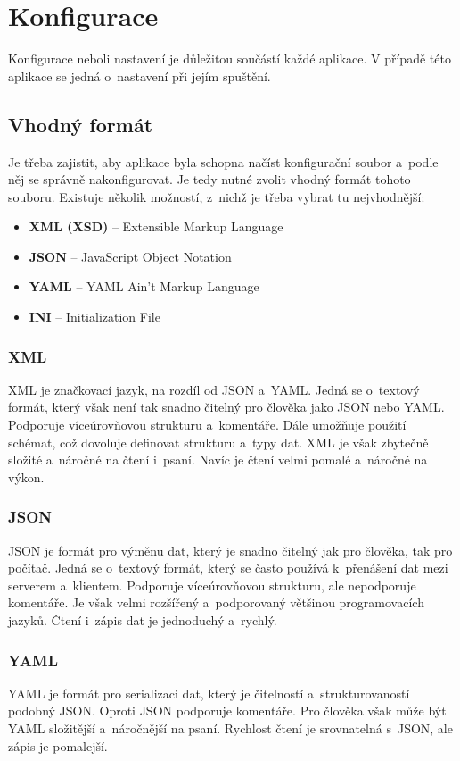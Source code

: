 \chapter{Konfigurace}
Konfigurace neboli nastavení je důležitou součástí každé aplikace.
V případě této aplikace se jedná o~nastavení při jejím spuštění.

\section{Vhodný formát}
Je třeba zajistit, aby aplikace byla schopna načíst konfigurační soubor a~podle něj se správně nakonfigurovat.
Je tedy nutné zvolit vhodný formát tohoto souboru.
Existuje několik možností, z~nichž je třeba vybrat tu nejvhodnější:

\begin{itemize}
    \item \textbf{XML (XSD)} -- Extensible Markup Language
    \item \textbf{JSON} -- JavaScript Object Notation
    \item \textbf{YAML} -- YAML Ain't Markup Language
    \item \textbf{INI} -- Initialization File
\end{itemize}

\subsection{XML}
\cite{cisco_xml_json_yaml}
XML je značkovací jazyk, na rozdíl od JSON a~YAML.
Jedná se o~textový formát, který však není tak snadno čitelný pro člověka jako JSON nebo YAML.
Podporuje víceúrovňovou strukturu a~komentáře.
Dále umožňuje použití schémat, což dovoluje definovat strukturu a~typy dat.
XML je však zbytečně složité a~náročné na čtení i~psaní.
Navíc je čtení velmi pomalé a~náročné na výkon.

\subsection{JSON}
\cite{cisco_xml_json_yaml}
JSON je formát pro výměnu dat, který je snadno čitelný jak pro člověka, tak pro počítač.
Jedná se o~textový formát, který se často používá k~přenášení dat mezi serverem a~klientem.
Podporuje víceúrovňovou strukturu, ale nepodporuje komentáře.
Je však velmi rozšířený a~podporovaný většinou programovacích jazyků.
Čtení i~zápis dat je jednoduchý a~rychlý.

\subsection{YAML}
\cite{cisco_xml_json_yaml}
YAML je formát pro serializaci dat, který je čitelností a~strukturovaností podobný JSON.
Oproti JSON podporuje komentáře.
Pro člověka však může být YAML složitější a~náročnější na psaní.
Rychlost čtení je srovnatelná s~JSON, ale zápis je pomalejší.

